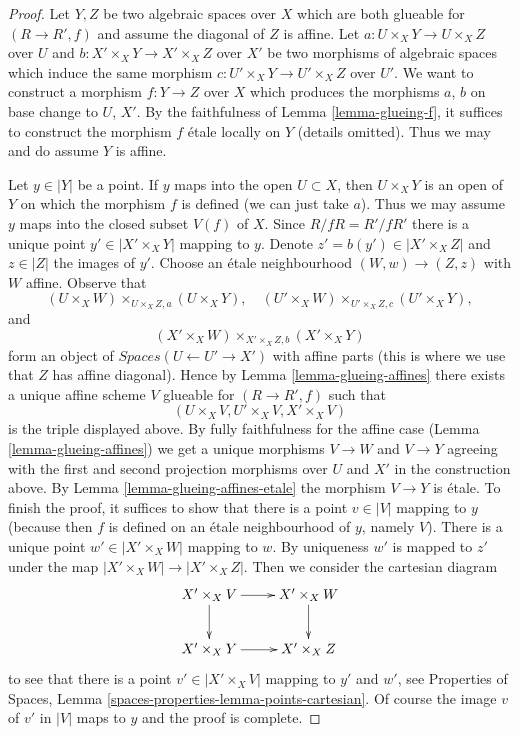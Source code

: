 \documentclass[10pt,a4paper]{amsart}
\theoremstyle{plain}
\theoremstyle{definition}
\theoremstyle{remark}
\numberwithin{equation}{subsection}
\begin{document}
\begin{proof}
Let $Y, Z$ be two algebraic spaces over $X$ which are both glueable for
$(R \to R', f)$ and assume the diagonal of $Z$ is affine. Let
$a : U \times_X Y \to U \times_X Z$ over $U$ and
$b : X' \times_X Y \to X' \times_X Z$ over $X'$ be two morphisms
of algebraic spaces
which induce the same morphism $c : U' \times_X Y \to U' \times_X Z$
over $U'$.
We want to construct a morphism $f : Y \to Z$ over $X$
which produces the morphisms $a$, $b$ on base change to $U$, $X'$.
By the faithfulness of Lemma \ref{lemma-glueing-f}, it suffices to construct
the morphism $f$ \'etale locally on $Y$ (details omitted).
Thus we may and do assume $Y$ is affine.

\medskip\noindent
Let $y \in |Y|$ be a point. If $y$ maps into the open $U \subset X$,
then $U \times_X Y$ is an open of $Y$ on which the morphism $f$
is defined (we can just take $a$).
Thus we may assume $y$ maps into the closed subset
$V(f)$ of $X$. Since $R/fR = R'/fR'$ there is a unique point
$y' \in |X' \times_X Y|$ mapping to $y$. Denote
$z' = b(y') \in |X' \times_X Z|$ and $z \in |Z|$ the images of $y'$.
Choose an \'etale neighbourhood $(W, w) \to (Z, z)$
with $W$ affine. Observe that
$$
(U \times_X W) \times_{U \times_X Z, a} (U \times_X Y),\quad
(U' \times_X W) \times_{U' \times_X Z, c} (U' \times_X Y),
$$
and
$$
(X' \times_X W) \times_{X' \times_X Z, b} (X' \times_X Y)
$$
form an object of $\textit{Spaces}(U \leftarrow U' \to X')$
with affine parts (this is where we use that $Z$ has affine diagonal).
Hence by Lemma \ref{lemma-glueing-affines}
there exists a unique affine scheme $V$ glueable for $(R \to R', f)$ such that
$$
(U \times_X V, U' \times_X V, X' \times_X V)
$$
is the triple displayed above. By fully faithfulness for the affine
case (Lemma \ref{lemma-glueing-affines}) we get a unique morphisms
$V \to W$ and $V \to Y$ agreeing with the first and second projection
morphisms over $U$ and $X'$ in the construction above.
By Lemma \ref{lemma-glueing-affines-etale} the morphism $V \to Y$ is \'etale.
To finish the proof, it suffices to show that there is a point $v \in |V|$
mapping to $y$ (because then $f$ is defined on an \'etale neighbourhood
of $y$, namely $V$).
There is a unique point $w' \in |X' \times_X W|$ mapping to $w$.
By uniqueness $w'$ is mapped to $z'$ under the map
$|X' \times_X W| \to |X' \times_X Z|$. Then we consider the cartesian
diagram
$$
\xymatrix{
X' \times_X V \ar[r] \ar[d] & X' \times_X W \ar[d] \\
X' \times_X Y \ar[r] & X' \times_X Z
}
$$
to see that there is a point $v' \in |X' \times_X V|$
mapping to $y'$ and $w'$, see
Properties of Spaces, Lemma \ref{spaces-properties-lemma-points-cartesian}.
Of course the image $v$ of $v'$ in $|V|$ maps to $y$ and the proof is complete.
\end{proof}
\end{document}
